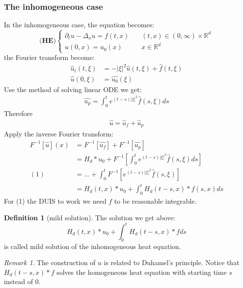 \documentclass[a4paper,11pt,oneside,fleqn]{book}
\theoremstyle{definition}
\newtheorem{definition}{Definition}[section]
\theoremstyle{remark}
\newtheorem*{remark}{Remark}
\begin{document}
\subsubsection*{The inhomogeneous case}
In the inhomogeneous case, the equation becomes:
\begin{equation} \label{HE:homogeneous}
\textbf{(HE)}\left\{
\begin{aligned}
	\partial_t u - \Delta_x u = f(t, x) \quad &(t, x) \in (0, \infty) \times \mathbb{R}^d\\
	u(0, x) = u_0(x) \quad &x \in \mathbb{R}^d
\end{aligned}
\right.	
\end{equation}
the Fourier transform become:
\begin{align*}
	\hat{u}_t(t, \xi) &= -|\xi|^2 \hat{u}(t, \xi) + \hat{f}(t, \xi) \\
	\hat{u}(0, \xi) &= \hat{u_0}(\xi)
\end{align*}
Use the method of solving linear ODE we get:
\begin{align*}
	\hat{u_p} = \int_0^t e^{(t - s)|\xi|^2} \hat{f}(s, \xi)ds
\end{align*}
Therefore
\begin{align*}
	\hat{u} = \hat{u}_f + \hat{u}_p
\end{align*}
Apply the inverse Fourier transform:
\begin{align*}
	F^{-1}[\hat{u}](x) &= F^{-1}[\hat{u_f}] + F^{-1}[\hat{u_p}]\\
	&= H_d*u_0 + F^{-1}[\int_0^t e^{(t-s)|\xi|^2} \hat{f}(s, \xi)ds]\\
 (1)&= \dots + \int_0^t F^{-1} [e^{(t-s)|\xi|^2} \hat{f}(s, \xi)]\\
 &= H_d(t, x)*u_0 + \int_0^t H_d(t-s, x)*f(s, x) ds
\end{align*}
For (1) the DUIS to work we need $f$ to be reasonable integrable.

\begin{definition}[mild solution]
The solution we get above:
\begin{equation}
	H_d(t, x)*u_0 + \int_0^t H_d(t-s, x)*f ds
\end{equation}
is called mild solution of the inhomogeneous heat equation.
\end{definition}
\begin{remark}
The construction of $u$ is related to Duhamel's principle. Notice that $H_d(t-s, x)*f$ solves the homogeneous heat equation with starting time $s$ instead of $0$.	
\end{remark}
\end{document}
